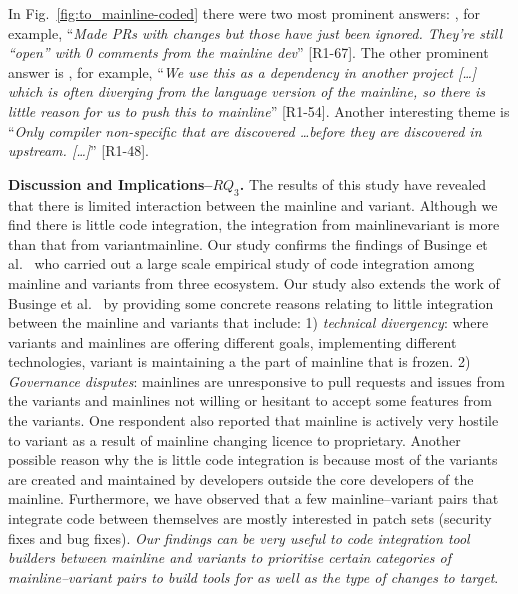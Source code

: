 In Fig.~\ref{fig:to_mainline-coded} there were two most prominent answers: , for example, ``\textit{Made PRs with changes but those have just been ignored. They're still ``open'' with 0 comments from the mainline dev}'' [R1-67]. The other prominent answer is , for example, ``\emph{We use this as a dependency in another project [\ldots] which is often diverging from the language version of the mainline, so there is little reason for us to push this to mainline}'' [R1-54]. Another interesting theme is ``\emph{Only compiler non-specific that are discovered \ldots before they are discovered in upstream. [\ldots]}'' [R1-48].

\nd \textbf{Discussion and Implications--$RQ_3$.}
The results of this study have revealed that there is limited interaction between the mainline and variant.
Although we find there is little code integration, the integration from mainline\ra variant is more than that from variant\ra mainline. 
Our study confirms the findings of Businge et al.~\cite{businge:emse:2021} who carried out a large scale empirical study of code integration among mainline and variants from three ecosystem. Our study also extends the work of Businge et al.~\cite{businge:emse:2021} by providing some concrete reasons relating to little integration between the mainline and variants that include: 1) \textit{technical divergency}: where variants and mainlines are offering different goals, implementing different technologies, variant is maintaining a the part of mainline that is frozen. 2) \textit{Governance disputes}: mainlines are unresponsive to pull requests and issues from the variants and  mainlines not willing or hesitant to accept some features from the variants. One respondent also reported that mainline is actively very hostile to variant as a result of mainline changing licence to proprietary.
Another possible reason why the is little code integration is because most of the variants are created and maintained by developers outside the core developers of the mainline.
Furthermore, we have observed that a few mainline--variant pairs that integrate code between themselves are mostly interested in patch sets (security fixes and bug fixes). 
\textit{Our findings can be very useful to code integration tool builders between mainline and variants to prioritise certain categories of mainline--variant pairs to build tools for as well as the type of changes to target}. 
